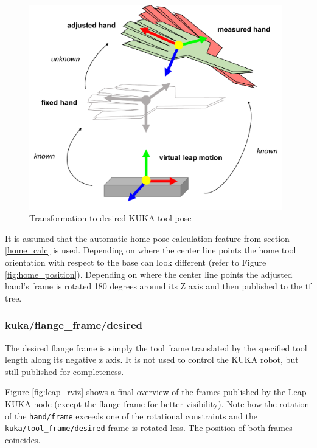 \documentclass[headsepline,footinclude=false,fontsize=11pt,paper=a4,listof=totoc,bibliography=totoc,BCOR=12mm,DIV=14]{scrbook}
\begin{document}
\begin{figure}[h]
    \centering
    \includegraphics[width=11cm]{images/hand_transform}
    \caption{Transformation to desired KUKA tool pose}
    \label{fig:hand_transform}
\end{figure}

It is assumed that the automatic home pose calculation feature from section \ref{home_calc} is used. Depending on where the center line points the home tool orientation with respect to the base can look different (refer to Figure \ref{fig:home_position}). Depending on where the center line points the adjusted hand's frame is rotated 180 degrees around its Z axis and then published to the tf tree. 

\subsubsection{kuka/flange\_frame/desired}

The desired flange frame is simply the tool frame translated by the specified tool length along its negative z axis. It is not used to control the KUKA robot, but still published for completeness. 

Figure \ref{fig:leap_rviz} shows a final overview of the frames published by the Leap KUKA node (except the flange frame for better visibility). Note how the rotation of the \texttt{hand/frame} exceeds one of the rotational constraints and the \texttt{kuka/tool\_frame/desired} frame is rotated less. The position of both frames coincides.
\end{document}

